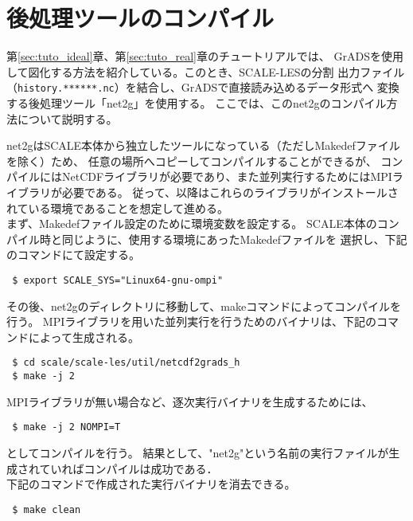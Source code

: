 \section{後処理ツールのコンパイル} \label{sec:source_net2g}

第\ref{sec:tuto_ideal}章、第\ref{sec:tuto_real}章のチュートリアルでは、
GrADSを使用して図化する方法を紹介している。このとき、SCALE-LESの分割
出力ファイル（\verb|history.******.nc|）を結合し、GrADSで直接読み込めるデータ形式へ
変換する後処理ツール「net2g」を使用する。
ここでは、このnet2gのコンパイル方法について説明する。

net2gはSCALE本体から独立したツールになっている（ただしMakedefファイルを除く）ため、
任意の場所へコピーしてコンパイルすることができるが、
コンパイルにはNetCDFライブラリが必要であり、また並列実行するためにはMPIライブラリが必要である。
従って、以降はこれらのライブラリがインストールされている環境であることを想定して進める。\\


まず、Makedefファイル設定のために環境変数を設定する。
SCALE本体のコンパイル時と同じように、使用する環境にあったMakedefファイルを
選択し、下記のコマンドにて設定する。

\begin{verbatim}
 $ export SCALE_SYS="Linux64-gnu-ompi"
\end{verbatim}

その後、net2gのディレクトリに移動して、makeコマンドによってコンパイルを行う。
MPIライブラリを用いた並列実行を行うためのバイナリは、下記のコマンドによって生成される。
\begin{verbatim}
 $ cd scale/scale-les/util/netcdf2grads_h
 $ make -j 2
\end{verbatim}
MPIライブラリが無い場合など、逐次実行バイナリを生成するためには、\\
\begin{verbatim}
 $ make -j 2 NOMPI=T
\end{verbatim}
としてコンパイルを行う。
結果として、"net2g"という名前の実行ファイルが生成されていればコンパイルは成功である．\\

下記のコマンドで作成された実行バイナリを消去できる。
\begin{verbatim}
 $ make clean
\end{verbatim}


